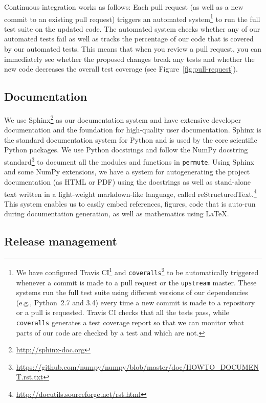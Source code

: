 \documentclass[]{article}
\begin{document}
Continuous integration works as follows:
Each pull request (as well as a new commit to an existing pull request) triggers
an automated system\footnote{
We have configured Travis CI\footnote{
  \url{https://travis-ci.org}
} 
and
\texttt{coveralls}\footnote{
  \url{https://coveralls.io}
}
to be automatically triggered whenever a commit is made to a pull request
or the \texttt{upstream} master.
These systems run the full test suite using different versions of our
dependencies (e.g., Python~2.7 and 3.4) every time a new commit is made to a
repository or a pull is requested.
Travis CI checks that all the tests pass, while \texttt{coveralls} generates a
test coverage report so that we can monitor what parts of our code are checked
by a test and which are not.
}
to run the full test suite on the updated code.
The automated system checks whether any of our automated tests fail as well
as tracks the percentage of our code that is covered by our automated tests.
This means that when you review a pull request, you can immediately see
whether the proposed changes break any tests and whether the new
code decreases the overall test coverage (see Figure~\ref{fig:pull-request}).

\subsection{Documentation}

We use Sphinx\footnote{
   \url{http://sphinx-doc.org}
} 
as our documentation system
and have extensive developer documentation and the foundation for
high-quality user documentation.
Sphinx is the standard documentation system for Python and is used by
the core scientific Python packages.
We use Python docstrings and follow the NumPy docstring
standard\footnote{
   \url{https://github.com/numpy/numpy/blob/master/doc/HOWTO\_DOCUMENT.rst.txt}
}
to document all the modules and functions in \texttt{permute}.
Using Sphinx and some NumPy extensions, we have a system for autogenerating the
project documentation (as HTML or PDF) using the docstrings as well as
stand-alone text written in a light-weight markdown-like language, called
reStructuredText.\footnote{\url{http://docutils.sourceforge.net/rst.html}}
This system enables us to easily embed references, figures, code that is
auto-run during documentation generation, as well as mathematics using \LaTeX.

\subsection{Release management}
\end{document}
